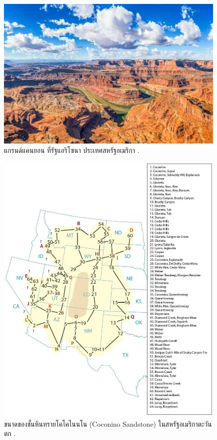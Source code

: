 \documentclass[10pt,twocolumn,letterpaper]{article}
\begin{document}
\begin{figure}[t]
\begin{center}
   \includegraphics[width=1\linewidth]{grand-canyon.jpg}

\end{center}
   \caption{แกรนด์แคนยอน ที่รัฐแอริโซนา ประเทศสหรัฐอเมริกา \cite{49}.}
\label{fig:2}
\label{fig:onecol}
\end{figure}

\begin{figure}[t]
\begin{center}
   \includegraphics[width=1\linewidth]{coconino.jpg}
\end{center}
   \caption{ขนาดของชั้นหินทรายโคโคไนนโน (Coconino Sandstone) ในสหรัฐอเมริกาตะวันตก \cite{21}.}
\label{fig:3}
\label{fig:onecol}
\end{figure}
\end{document}
